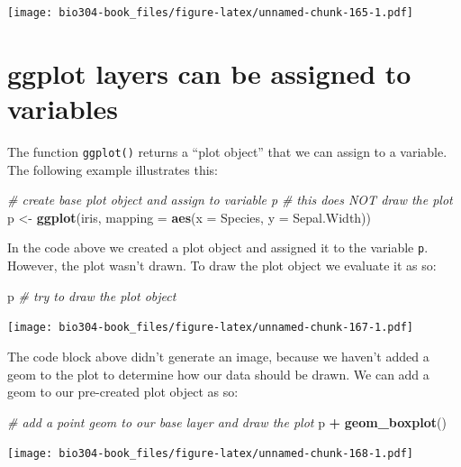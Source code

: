 \documentclass[]{book}
\newenvironment{Shaded}{\begin{snugshade}}{\end{snugshade}}
\newcommand{\CommentTok}[1]{\textcolor[rgb]{0.56,0.35,0.01}{\textit{#1}}}
\newcommand{\DataTypeTok}[1]{\textcolor[rgb]{0.13,0.29,0.53}{#1}}
\newcommand{\KeywordTok}[1]{\textcolor[rgb]{0.13,0.29,0.53}{\textbf{#1}}}
\newcommand{\NormalTok}[1]{#1}
\newcommand{\OperatorTok}[1]{\textcolor[rgb]{0.81,0.36,0.00}{\textbf{#1}}}
\newcommand{\StringTok}[1]{\textcolor[rgb]{0.31,0.60,0.02}{#1}}
\theoremstyle{definition}
\theoremstyle{definition}
\theoremstyle{definition}
\theoremstyle{remark}
\begin{document}
\texttt{[image: bio304-book\_files/figure-latex/unnamed-chunk-165-1.pdf]}

\hypertarget{ggplot-layers-can-be-assigned-to-variables}{%
\section{ggplot layers can be assigned to
variables}\label{ggplot-layers-can-be-assigned-to-variables}}

The function \texttt{ggplot()} returns a ``plot object'' that we can
assign to a variable. The following example illustrates this:

\begin{Shaded}
\begin{Highlighting}[]
\CommentTok{# create base plot object and assign to variable p}
\CommentTok{# this does NOT draw the plot}
\NormalTok{p <-}\StringTok{ }\KeywordTok{ggplot}\NormalTok{(iris, }\DataTypeTok{mapping =} \KeywordTok{aes}\NormalTok{(}\DataTypeTok{x =}\NormalTok{ Species, }\DataTypeTok{y =}\NormalTok{ Sepal.Width))   }
\end{Highlighting}
\end{Shaded}

In the code above we created a plot object and assigned it to the
variable \texttt{p}. However, the plot wasn't drawn. To draw the plot
object we evaluate it as so:

\begin{Shaded}
\begin{Highlighting}[]
\NormalTok{p  }\CommentTok{# try to draw the plot object}
\end{Highlighting}
\end{Shaded}

\texttt{[image: bio304-book\_files/figure-latex/unnamed-chunk-167-1.pdf]}

The code block above didn't generate an image, because we haven't added
a geom to the plot to determine how our data should be drawn. We can add
a geom to our pre-created plot object as so:

\begin{Shaded}
\begin{Highlighting}[]
\CommentTok{# add a point geom to our base layer and draw the plot}
\NormalTok{p }\OperatorTok{+}\StringTok{ }\KeywordTok{geom_boxplot}\NormalTok{()}
\end{Highlighting}
\end{Shaded}

\texttt{[image: bio304-book\_files/figure-latex/unnamed-chunk-168-1.pdf]}
\end{document}
